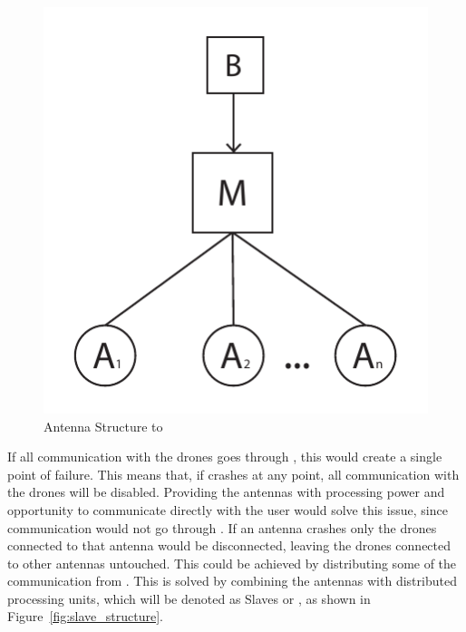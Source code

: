 \begin{figure}[htb]
    \centering
    \includegraphics[width=\textwidth]{gfx/antenna_structure.pdf}
    \caption{Antenna Structure to \projectname{}}
    \label{fig:antenna_structure}
\end{figure}

If all communication with the drones goes through , this would create a single point of failure.
This means that, if  crashes at any point, all communication with the drones will be disabled.
Providing the antennas with processing power and opportunity to communicate directly with the user would solve this issue, since communication would not go through .
If an antenna crashes only the drones connected to that antenna would be disconnected, leaving the drones connected to other antennas untouched.
This could be achieved by distributing some of the communication from .
This is solved by combining the antennas with distributed processing units, which will be denoted as Slaves or , as shown in Figure~\ref{fig:slave_structure}.

